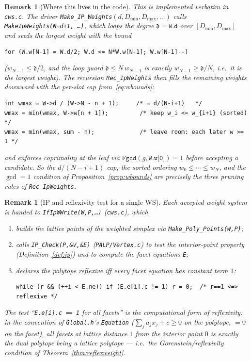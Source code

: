 \documentclass{amsart}
\newtheorem{remark}[theorem]{Remark}
\begin{document}
\begin{remark}[Where this lives in the code]\label{rmk:wbounds-code}
This is implemented \emph{verbatim} in \texttt{cws.c}. The driver
\texttt{Make\_IP\_Weights}$(d, D_{\min}, D_{\max}, \dots)$ calls
\texttt{MakeIpWeights(N=d+1, \dots)}, which loops the degree
$\mathfrak{d}=\texttt{W.d}$ over $[D_{\min},D_{\max}]$ and seeds the largest
weight with the bound
\begin{verbatim}
for (W.w[N-1] = W.d/2; W.d <= N*W.w[N-1]; W.w[N-1]--)
\end{verbatim}
($w_{N-1}\le \mathfrak d/2$, and the loop guard $\mathfrak d \le N\,w_{N-1}$
is exactly $w_{N-1}\ge \mathfrak d/N$, i.e.\ it is the \emph{largest}
weight). The recursion \texttt{Rec\_IpWeights} then fills the remaining
weights downward with the per-slot cap from~\eqref{eq:wbounds}:
\begin{verbatim}
int wmax = W->d / (W->N - n + 1);     /* = d/(N-i+1)   */
wmax = min(wmax, W->w[n + 1]);         /* keep w_i <= w_{i+1} (sorted) */
wmax = min(wmax, sum - n);             /* leave room: each later w >= 1 */
\end{verbatim}
and enforces coprimality at the leaf via
$\texttt{Fgcd}(g,\texttt{W.w[0]})=1$ before accepting a candidate. So the
$d/(N-i+1)$ cap, the sorted ordering $w_0\le\cdots\le w_N$, and the
$\gcd=1$ condition of Proposition~\ref{prop:wbounds} are precisely the three
pruning rules of \texttt{Rec\_IpWeights}.
\end{remark}

\begin{remark}[IP and reflexivity test for a single WS]\label{rmk:ipref-code}
Each accepted weight system is handed to
\texttt{IfIpWWrite(W,P,\dots)} (\texttt{cws.c}), which
\begin{enumerate}
  \item builds the lattice points of the weighted simplex via
        \texttt{Make\_Poly\_Points(W,P)};
  \item calls \texttt{IP\_Check(P,\&V,\&E)} (\texttt{PALP/Vertex.c}) to test
        the interior-point property (Definition~\ref{def:ip}) and to compute
        the facet equations \texttt{E};
  \item declares the polytope \emph{reflexive} iff every facet equation has
        constant term $1$:
\begin{verbatim}
while (r && (++i < E.ne)) if (E.e[i].c != 1) r = 0;  /* r==1 <=> reflexive */
\end{verbatim}
\end{enumerate}
The test ``\texttt{E.e[i].c == 1} for all facets'' is the computational form
of reflexivity: in the convention of \texttt{Global.h}'s \texttt{Equation}
($\sum_j a_j x_j + c \ge 0$ on the polytope, $=0$ on the facet), all facets
at lattice distance $1$ from the interior point $0$ is exactly the dual
polytope being a lattice polytope --- i.e.\ the Gorenstein/reflexivity
condition of Theorem~\ref{thm:reflexweight}.
\end{remark}
\end{document}
